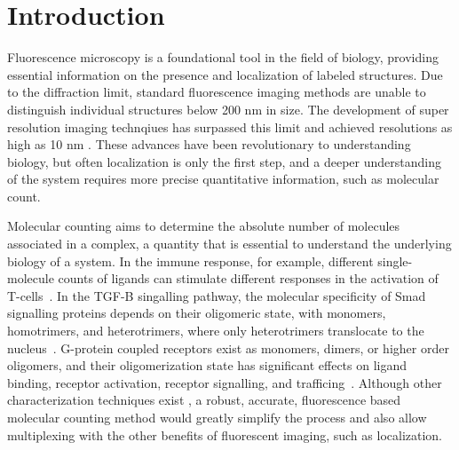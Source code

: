 \section{Introduction}


Fluorescence microscopy is a foundational tool in the field of biology,
  providing essential information on the presence and localization 
  of labeled structures.
  Due to the diffraction limit, standard fluorescence imaging methods are unable to distinguish 
  individual structures below 200 nm in size.
  The development of super resolution imaging technqiues \cite{betzig_2006, rust_2006} has surpassed 
  this limit and achieved resolutions as high as 10 nm \cite{valli_seeing_2021}.
  These advances have been revolutionary to understanding biology, 
  but often localization is only the first step,
  and a deeper understanding of the system requires more precise
  quantitative information, such as molecular count. 

Molecular counting aims to determine the absolute number of molecules
associated in a complex, a quantity that is essential to understand the
underlying biology of a system.
  In the immune response, for example, different single-molecule counts of
  ligands can stimulate different responses in the activation of
  T-cells~\cite{irvine_2002}.
  In the TGF-B singalling pathway, the molecular specificity of Smad signalling
  proteins depends on their oligomeric state, with monomers, homotrimers, and
  heterotrimers, where only heterotrimers translocate to the
  nucleus~\cite{moustakas_2002, inman_2002}.
  G-protein coupled receptors exist as monomers, dimers, or higher order
  oligomers, and their oligomerization state has significant effects on ligand
  binding, receptor activation, receptor signalling, and
  trafficing~\cite{felce_2018, breitwieser_2004}.
  Although other characterization techniques exist , a robust,
  accurate, fluorescence based molecular counting method would greatly simplify
  the process and also allow multiplexing with the other
  benefits of fluorescent imaging, such as localization.

